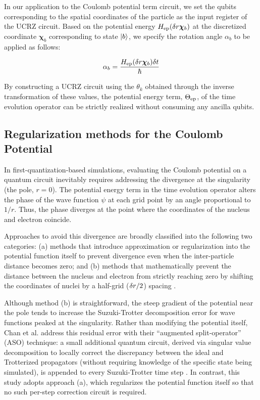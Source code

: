 \documentclass[aip-draft.tex]{subfiles}
\begin{document}
In our application to the Coulomb potential term circuit, we set the qubits
corresponding to the spatial coordinates of the particle as the input register
of the UCRZ circuit. Based on the potential energy $H_{\mathrm{ep}}(\delta r\bm{\chi}_b)$ at
the discretized coordinate $\bm{\chi}_b$ corresponding to state $\ket{b}$, we
specify the rotation angle $\alpha_b$ to be applied as follows:

\begin{equation}
\alpha_b = \frac{H_{\mathrm{ep}}(\delta r\bm{\chi}_b)\delta t}{\hbar}
\end{equation}

By constructing a UCRZ circuit using the $\theta_k$ obtained through the inverse
transformation of these values, the potential energy term, $\Theta_{\mathrm{ep}}$, of the
time evolution operator can be strictly realized without consuming any ancilla
qubits.

\subsection{Regularization methods for the Coulomb Potential}
\label{subsec:coulomb-potential-handling}
In first-quantization-based simulations, evaluating the Coulomb potential on a
quantum circuit inevitably requires addressing the divergence at the singularity
(the pole, $r=0$). The potential energy term in the time evolution operator
alters the phase of the wave function $\psi$ at each grid point by an angle
proportional to $  1/r$. Thus, the phase diverges at the point where the
coordinates of the nucleus and electron coincide.

Approaches to avoid this divergence are broadly classified into the following
two categories: (a) methods that introduce approximation or regularization into
the potential function itself to prevent divergence even when the inter-particle
distance becomes zero; and (b) methods that mathematically prevent the distance
between the nucleus and electron from strictly reaching zero by shifting the
coordinates of nuclei by a half-grid ($\delta r/2$) spacing 
\cite{Chan2023.sciadv.abo7484}.

Although method (b) is straightforward, the steep gradient of the potential
near the pole tends to increase the Suzuki-Trotter decomposition error for
wave functions peaked at the singularity. Rather than modifying the
potential itself, Chan et al. address this residual error with their
``augmented split-operator'' (ASO) technique: a small additional quantum
circuit, derived via singular value decomposition to locally correct the
discrepancy between the ideal and Trotterized propagators (without
requiring knowledge of the specific state being simulated), is appended to
every Suzuki-Trotter time step \cite{Chan2023.sciadv.abo7484}. In contrast,
this study adopts approach (a), which regularizes the potential function
itself so that no such per-step correction circuit is required.
\end{document}
